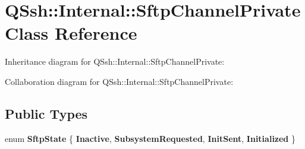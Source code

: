 \hypertarget{class_q_ssh_1_1_internal_1_1_sftp_channel_private}{}\section{Q\+Ssh\+:\+:Internal\+:\+:Sftp\+Channel\+Private Class Reference}
\label{class_q_ssh_1_1_internal_1_1_sftp_channel_private}


Inheritance diagram for Q\+Ssh\+:\+:Internal\+:\+:Sftp\+Channel\+Private\+:


Collaboration diagram for Q\+Ssh\+:\+:Internal\+:\+:Sftp\+Channel\+Private\+:
\subsection*{Public Types}
\begin{DoxyCompactItemize}
\item 
\mbox{\label{class_q_ssh_1_1_internal_1_1_sftp_channel_private_a5b36817e75ad4894a01ac59b659eda37}} 
enum {\bfseries Sftp\+State} \{ {\bfseries Inactive}, 
{\bfseries Subsystem\+Requested}, 
{\bfseries Init\+Sent}, 
{\bfseries Initialized}
 \}
\end{DoxyCompactItemize}
